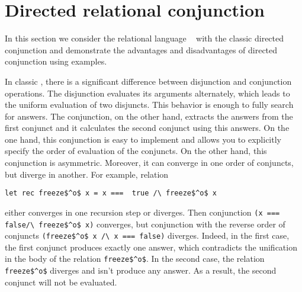 \section{Directed relational conjunction}

In this section we consider the relational language \mk~ with the classic directed conjunction and demonstrate the advantages and disadvantages of directed conjunction using examples. 

In classic \mk, there is a significant difference between disjunction and conjunction operations. 
The disjunction evaluates its arguments alternately, which leads to the uniform evaluation of two disjuncts. 
This behavior is enough to fully search for answers. 
The conjunction, on the other hand, extracts the answers from the first conjunct and it calculates the second conjunct using this answers.
On the one hand, this conjunction is easy to implement and allows you to explicitly specify the order of evaluation of the conjuncts.
On the other hand, this conjunction is asymmetric. 
Moreover, it can converge in one order of conjuncts, but diverge in another.
For example, relation
\begin{lstlisting}
let rec freeze$^o$ x = x ===  true /\ freeze$^o$ x
\end{lstlisting}
either converges in one recursion step or diverges.
Then conjunction \lstinline{(x === false/\ freeze$^o$ x)} converges, but conjunction with the reverse order of conjuncts \lstinline{(freeze$^o$ x /\ x === false)} diverges.
Indeed, in the first case, the first conjunct produces exactly one answer, which contradicts the unification in the body of the relation \lstinline{freeze$^o$}. In the second case, the relation \lstinline{freeze$^o$} diverges and isn't produce any answer. As a result, the second conjunct will not be evaluated.

